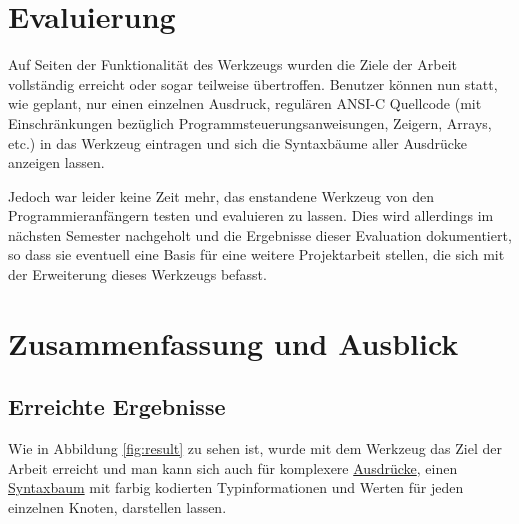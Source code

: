 \documentclass[oneside]{ausarbeitung}
\begin{document}
\chapter{Evaluierung}
\label{cha:evaluation}
Auf Seiten der Funktionalität des Werkzeugs wurden die Ziele der Arbeit vollständig erreicht oder sogar teilweise übertroffen. Benutzer können nun statt, wie geplant, nur einen einzelnen Ausdruck, regulären ANSI-C Quellcode (mit Einschränkungen bezüglich Programmsteuerungsanweisungen, Zeigern, Arrays, etc.) in das Werkzeug eintragen und sich die Syntaxbäume aller Ausdrücke anzeigen lassen.

Jedoch war leider keine Zeit mehr, das enstandene Werkzeug von den Programmieranfängern testen und evaluieren zu lassen. Dies wird allerdings im nächsten Semester nachgeholt und die Ergebnisse dieser Evaluation dokumentiert, so dass sie eventuell eine Basis für eine weitere Projektarbeit stellen, die sich mit der Erweiterung dieses Werkzeugs befasst.

\chapter{Zusammenfassung und Ausblick}
\label{cha:zusammenfassung}
\section{Erreichte Ergebnisse}
\label{sec:ergebnisse}

Wie in Abbildung \ref{fig:result} zu sehen ist, wurde mit dem Werkzeug das Ziel der Arbeit erreicht und man kann sich auch für komplexere \hyperref[sub:expression]{Ausdrücke}, einen \hyperref[sub:syntax_tree]{Syntaxbaum} mit farbig kodierten Typinformationen und Werten für jeden einzelnen Knoten, darstellen lassen.
\end{document}
